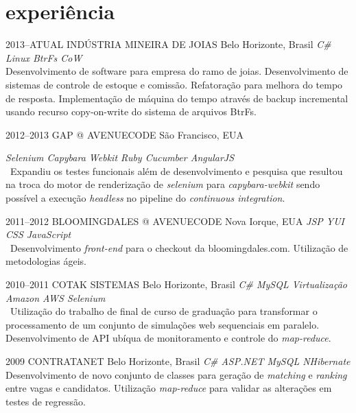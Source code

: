 \documentclass[]{friggeri-cv}
\begin{document}
\section{experiência}

\begin{entrylist}

\entry
{2013--ATUAL}
{INDÚSTRIA MINEIRA DE JOIAS}
{Belo Horizonte, Brasil}
{\emph{\bullet C\# \bullet Linux \bullet BtrFs CoW  } \\ Desenvolvimento de software para empresa do ramo de joias. Desenvolvimento de sistemas de controle de estoque e comissão. Refatoração para melhora do tempo de resposta. Implementação de máquina do tempo através de backup incremental usando recurso copy-on-write do sistema de arquivos BtrFs. }

\entry
{2012--2013}
{GAP @ AVENUECODE}
{São Francisco, EUA}
{\emph{\bullet Selenium \bullet Capybara \bullet Webkit \bullet Ruby \bullet Cucumber \bullet AngularJS } \\
\
Expandiu os testes funcionais além de desenvolvimento e pesquisa que resultou na troca do motor de renderização de \textit{selenium} para \textit{capybara-webkit} sendo possível a execução \textit{headless} no pipeline do \textit{continuous integration}.%

}


\entry
{2011--2012}
{BLOOMINGDALES @ AVENUECODE}
{Nova Iorque, EUA}
{\emph{\bullet JSP \bullet YUI \bullet CSS \bullet JavaScript } \\
\
Desenvolvimento \textit{front-end} para o checkout da bloomingdales.com. Utilização de metodologias ágeis.
}


\entry
{2010--2011}
{COTAK SISTEMAS}
{Belo Horizonte, Brasil}
{\emph{\bullet C\# \bullet MySQL \bullet Virtualização \bullet Amazon AWS \bullet Selenium } \\
\
Utilização do trabalho de final de curso de graduação para transformar o processamento de um conjunto de simulações web sequenciais em paralelo. Desenvolvimento de API ubíqua de monitoramento e controle do \textit{map-reduce}.
}


\entry
{2009}
{CONTRATANET}
{Belo Horizonte, Brasil}
{\emph{\bullet C\# \bullet ASP.NET \bullet MySQL \bullet NHibernate } \\ Desenvolvimento de novo conjunto de classes para geração de \textit{matching} e \textit{ranking} entre vagas e candidatos. Utilização \textit{map-reduce} para validar as alterações em testes de regressão. }


\end{entrylist}
\end{document}
